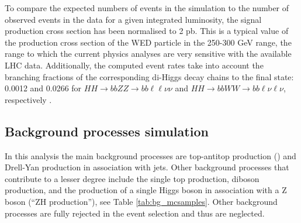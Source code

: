 To compare the expected numbers of events in the simulation to the number of observed events in the data for a given integrated luminosity, the signal production cross section has been normalised to 2 pb. This is a typical value of the production cross section of the WED particle in the 250-300 GeV range, the range to which the current physics analyses are very sensitive with the available LHC data. Additionally, the computed event rates take into account the branching fractions of the corresponding di-Higgs decay chains to the final state: 0.0012 and 0.0266 for $HH\to bbZZ\to bb\ell\ell\nu\nu$ and $HH\to bbWW\to bb\ell\nu\ell\nu$, respectively \cite{CERNYR4}.



%
%

\subsection{Background processes simulation\label{sec:bkgMC}}
In this analysis the main background processes are top-antitop production (\ttbar) and Drell-Yan production in association with jets. 
Other background processes that contribute to a lesser degree include the single top production, diboson production, and the production of a single Higgs boson in association with a Z boson (``ZH production''), see Table \ref{tab:bg_mcsamples}. Other background processes are fully rejected in the event selection and thus are neglected.  


